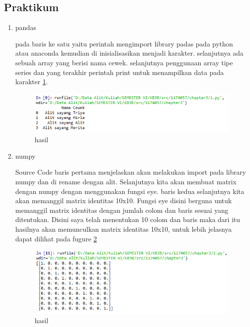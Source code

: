 \subsection{Praktikum}
\begin{enumerate}
\item pandas \par
pada baris ke satu yaitu perintah mengimport library padas pada python atau anaconda kemudian di inisialisasikan menjadi karakter. selanjutnya ada sebuah array yang berisi nama cewek. selanjutnya penggunaan array tipe series dan yang terakhir perintah print untuk menampilkan data pada karakter \ref{contoh1}.

\begin{figure}[ht]
\centering
\includegraphics[scale=1]{figures/1174057/chapter3/4.PNG}
\caption{hasil}
\label{contoh1}
\end{figure}

\item numpy\par
Source Code baris pertama menjelaskan akan melakukan import pada library numpy dan di rename dengan alit. Selanjutnya kita akan membuat matrix dengan numpy dengan menggunakan fungsi eye. baris kedua selanjutnya kita akan memanggil matrix identitas 10x10. Fungsi eye disini berguna untuk memanggil matrix identitas dengan jumlah colom dan baris sesuai yang ditentukan. Disini saya telah menentukan 10 colom dan baris maka dari itu hasilnya akan memunculkan matrix identitas 10x10, untuk lebih jelasnya dapat dilihat pada fugure \ref{contoh2}

\begin{figure}[ht]
\centering
\includegraphics[scale=0.7]{figures/1174057/chapter3/5.PNG}
\caption{hasil}
\label{contoh2}
\end{figure}


\end{enumerate}

